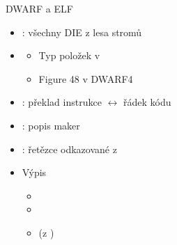 \begin{frame}{DWARF a ELF}

  \begin{itemize}
    \item {}: všechny DIE z lesa stromů
    \item {}
    \begin{itemize}
      \item Typ položek v 
      \item Figure 48 v DWARF4
    \end{itemize}

    \pause

    \item {}: překlad instrukce $\leftrightarrow$ řádek kódu
    \item {}: popis maker
    \item {}: řetězce odkazované z 

    \pause

    \item Výpis
    \begin{itemize}
      \item {}
      \item {}
      \item {} (z )
    \end{itemize}
  \end{itemize}

\end{frame}

